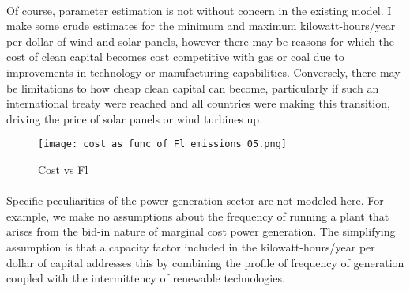 \documentclass{easychithesis}
\begin{document}
\paragraph{} Of course, parameter estimation is not without concern in the existing model. I make some crude estimates for the minimum and maximum kilowatt-hours/year per dollar of wind and solar panels, however there may be reasons for which the cost of clean capital becomes cost competitive with gas or coal due to improvements in technology or manufacturing capabilities. Conversely, there may be limitations to how cheap clean capital can become, particularly if such an international treaty were reached and all countries were making this transition, driving the price of solar panels or wind turbines up. 

\begin{figure}[h]
\texttt{[image: cost\_as\_func\_of\_Fl\_emissions\_05.png]}
\caption{Cost vs Fl\label{fig:costVsFl}}
\end{figure}

\paragraph{} Specific peculiarities of the power generation sector are not modeled here. For example, we make no assumptions about the frequency of running a plant that arises from the bid-in nature of marginal cost power generation. The simplifying assumption is that a capacity factor included in the kilowatt-hours/year per dollar of capital addresses this by combining the profile of frequency of generation coupled with the intermittency of renewable technologies. 
\end{document}

